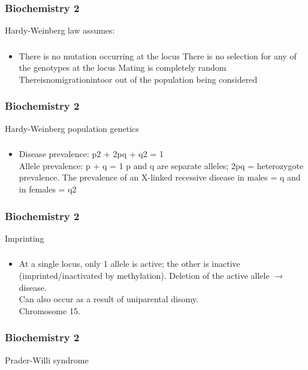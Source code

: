 \documentclass[11pt]{beamer}
\begin{document}
\begin{frame}
 \frametitle{Biochemistry 2}
Hardy-Weinberg law assumes:
\end{frame}

\begin{frame}
 \frametitle{}
\begin{itemize}
\item There is no mutation occurring at the locus There is no selection for any of the genotypes at the locus
Mating is completely random Thereisnomigrationintoor out of the population
being considered
\end{itemize}
\end{frame}

\begin{frame}
 \frametitle{Biochemistry 2}
Hardy-Weinberg population genetics
\end{frame}

\begin{frame}
 \frametitle{}
\begin{itemize}
\item Disease prevalence: p2 + 2pq + q2 = 1 \\ Allele prevalence:	p + q = 1 p and q are separate alleles; 2pq = heterozygote \\ prevalence. The prevalence of an X-linked recessive disease in males = q and in females = q2
\end{itemize}
\end{frame}

\begin{frame}
 \frametitle{Biochemistry 2}
Imprinting
\end{frame}

\begin{frame}
 \frametitle{}
\begin{itemize}
\item At a single locus, only 1 allele is active; the other is inactive (imprinted/inactivated by methylation). Deletion of the active allele ${\rightarrow}$ disease. \\ Can also occur as a result of uniparental disomy. \\ Chromosome 15. 
\end{itemize}
\end{frame}

\begin{frame}
 \frametitle{Biochemistry 2}
Prader-Willi syndrome
\end{frame}
\end{document}
